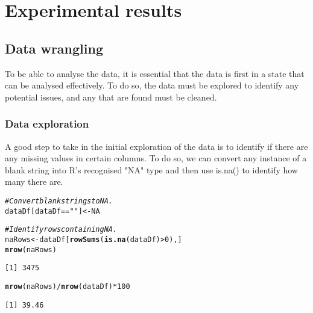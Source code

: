 \documentclass[12pt]{report}\usepackage[]{graphicx}\usepackage[]{xcolor}
\makeatletter
\newcommand{\hlnum}[1]{\textcolor[rgb]{0.686,0.059,0.569}{#1}}%
\newcommand{\hlstr}[1]{\textcolor[rgb]{0.192,0.494,0.8}{#1}}%
\newcommand{\hlcom}[1]{\textcolor[rgb]{0.678,0.584,0.686}{\textit{#1}}}%
\newcommand{\hlopt}[1]{\textcolor[rgb]{0,0,0}{#1}}%
\newcommand{\hlstd}[1]{\textcolor[rgb]{0.345,0.345,0.345}{#1}}%
\newcommand{\hlkwb}[1]{\textcolor[rgb]{0.69,0.353,0.396}{#1}}%
\newcommand{\hlkwd}[1]{\textcolor[rgb]{0.737,0.353,0.396}{\textbf{#1}}}%
\newenvironment{kframe}{%
 \def\at@end@of@kframe{}%
 \ifinner\ifhmode%
  \def\at@end@of@kframe{\end{minipage}}%
  \begin{minipage}{\columnwidth}%
 \fi\fi%
 \def\FrameCommand##1{\hskip\@totalleftmargin \hskip-\fboxsep
 \colorbox{shadecolor}{##1}\hskip-\fboxsep
     \hskip-\linewidth \hskip-\@totalleftmargin \hskip\columnwidth}%
 \MakeFramed {\advance\hsize-\width
   \@totalleftmargin\z@ \linewidth\hsize
   \@setminipage}}%
 {\par\unskip\endMakeFramed%
 \at@end@of@kframe}
\newenvironment{knitrout}{}{} %
\makeatother
\begin{document}
    \pagebreak
    
    \chapter{Experimental results}


    

\section{Data wrangling}
    To be able to analyse the data, it is essential that the data is first in a state that
    can be analysed effectively. To do so, the data must be explored to identify any potential
    issues, and any that are found must be cleaned.
    
    \subsection{Data exploration}
    A good step to take in the initial exploration of the data is to identify if there are any missing values
    in certain columns. To do so, we can convert any instance of a blank string into R's recognised "NA" type and
    then use is.na() to identify how many there are.

\begin{knitrout}
\color{fgcolor}\begin{kframe}
\begin{alltt}
\hlcom{# Convert blank strings to NA.}
\hlstd{dataDf[dataDf} \hlopt{==} \hlstr{""}\hlstd{]} \hlkwb{<-} \hlnum{NA}

\hlcom{# Identify rows containing NA.}
\hlstd{naRows} \hlkwb{<-} \hlstd{dataDf[}\hlkwd{rowSums}\hlstd{(}\hlkwd{is.na}\hlstd{(dataDf)} \hlopt{>} \hlnum{0}\hlstd{),]}
\hlkwd{nrow}\hlstd{(naRows)}
\end{alltt}
\begin{verbatim}
[1] 3475
\end{verbatim}
\begin{alltt}
\hlkwd{nrow}\hlstd{(naRows)}\hlopt{/}\hlkwd{nrow}\hlstd{(dataDf)}\hlopt{*}\hlnum{100}
\end{alltt}
\begin{verbatim}
[1] 39.46
\end{verbatim}
\end{kframe}
\end{knitrout}
    
\end{document}
